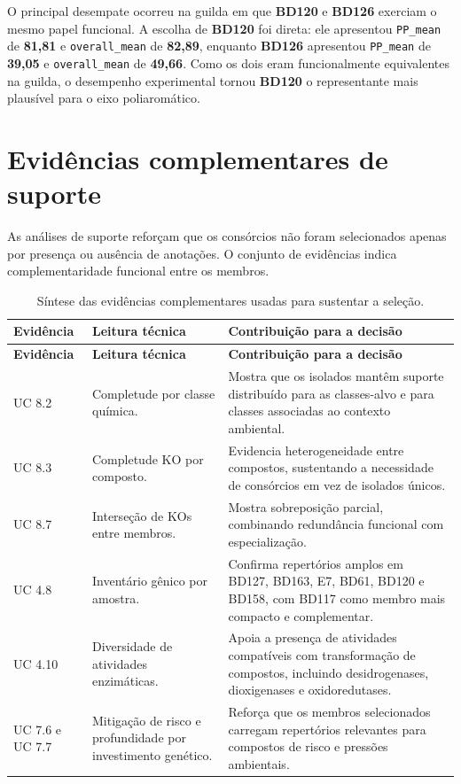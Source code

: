 \documentclass[12pt,a4paper]{article}
\begin{document}
O principal desempate ocorreu na guilda em que \textbf{BD120} e \textbf{BD126} exerciam o mesmo papel funcional. A escolha de \textbf{BD120} foi direta: ele apresentou \texttt{PP\_mean} de \textbf{81,81} e \texttt{overall\_mean} de \textbf{82,89}, enquanto \textbf{BD126} apresentou \texttt{PP\_mean} de \textbf{39,05} e \texttt{overall\_mean} de \textbf{49,66}. Como os dois eram funcionalmente equivalentes na guilda, o desempenho experimental tornou \textbf{BD120} o representante mais plausível para o eixo poliaromático.

\section{Evidências complementares de suporte}

As análises de suporte reforçam que os consórcios não foram selecionados apenas por presença ou ausência de anotações. O conjunto de evidências indica complementaridade funcional entre os membros.

\begin{longtable}{p{2.4cm}p{5.3cm}p{6.4cm}}
\caption{Síntese das evidências complementares usadas para sustentar a seleção.}\\
\toprule
\textbf{Evidência} & \textbf{Leitura técnica} & \textbf{Contribuição para a decisão} \\
\midrule
\endfirsthead
\toprule
\textbf{Evidência} & \textbf{Leitura técnica} & \textbf{Contribuição para a decisão} \\
\midrule
\endhead
UC 8.2 & Completude por classe química. & Mostra que os isolados mantêm suporte distribuído para as classes-alvo e para classes associadas ao contexto ambiental. \\
UC 8.3 & Completude KO por composto. & Evidencia heterogeneidade entre compostos, sustentando a necessidade de consórcios em vez de isolados únicos. \\
UC 8.7 & Interseção de KOs entre membros. & Mostra sobreposição parcial, combinando redundância funcional com especialização. \\
UC 4.8 & Inventário gênico por amostra. & Confirma repertórios amplos em BD127, BD163, E7, BD61, BD120 e BD158, com BD117 como membro mais compacto e complementar. \\
UC 4.10 & Diversidade de atividades enzimáticas. & Apoia a presença de atividades compatíveis com transformação de compostos, incluindo desidrogenases, dioxigenases e oxidoredutases. \\
UC 7.6 e UC 7.7 & Mitigação de risco e profundidade por investimento genético. & Reforça que os membros selecionados carregam repertórios relevantes para compostos de risco e pressões ambientais. \\
\bottomrule
\end{longtable}
\end{document}
